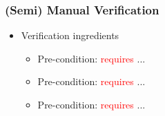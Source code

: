 
\begin{frame}

\frametitle{(Semi) Manual Verification}

\begin{itemize}

\item Verification ingredients

\begin{itemize}

\item Pre-condition: \textcolor{red}{requires} ...

\item Pre-condition: \textcolor{red}{requires} ...

\item Pre-condition: \textcolor{red}{requires} ...

\end{itemize}

\end{itemize}

\end{frame}
